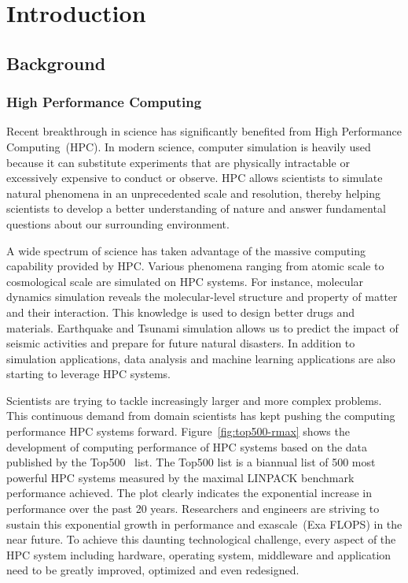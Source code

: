 \chapter{Introduction}

\section{Background}\label{sec:i-background}

\subsection{High Performance Computing}

Recent breakthrough in science has significantly benefited from High
Performance Computing~(HPC). In modern science, computer simulation is heavily
used because it can substitute experiments that are physically intractable
or excessively expensive to conduct or observe. HPC allows scientists to
simulate natural phenomena in an unprecedented scale and resolution, thereby
helping scientists to develop a better understanding of nature and answer
fundamental questions about our surrounding environment.

A wide spectrum of science has taken advantage of the massive computing
capability provided by HPC\@. Various phenomena ranging from atomic scale to
cosmological scale are simulated on HPC systems. For instance, molecular
dynamics simulation reveals the molecular-level structure and property of
matter and their interaction. This knowledge is used to design better drugs
and materials. Earthquake and Tsunami simulation allows us to predict the
impact of seismic activities and prepare for future natural disasters. In
addition to simulation applications, data analysis and machine learning
applications are also starting to leverage HPC systems.

Scientists are trying to tackle increasingly larger and more complex problems.
This continuous demand from domain scientists has kept pushing the computing
performance HPC systems forward. Figure~\ref{fig:top500-rmax} shows the
development of computing performance of HPC systems based on the data
published by the Top500~\autocite{top500} list. The Top500 list is a biannual
list of 500 most powerful HPC systems measured by the maximal LINPACK
benchmark performance achieved. The plot clearly indicates the exponential
increase in performance over the past 20 years. Researchers and engineers are
striving to sustain this exponential growth in performance and exascale~(Exa
FLOPS) in the near future. To achieve this daunting technological challenge,
every aspect of the HPC system including hardware, operating system,
middleware and application need to be greatly improved, optimized and even
redesigned.

